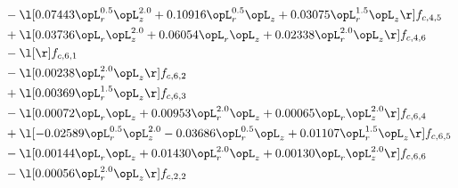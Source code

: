 \begin{alignat}{2}
& - \l[  0.07443 \opL_r^{0.5} \opL_z^{2.0} +  0.10916 \opL_r^{0.5} \opL_z +  0.03075 \opL_r^{1.5} \opL_z  \r] f_{c,4,5} \nonumber \\ 
& + \l[  0.03736 \opL_r \opL_z^{2.0} +  0.06054 \opL_r \opL_z +  0.02338 \opL_r^{2.0} \opL_z  \r] f_{c,4,6} \nonumber \\ 
& - \l[  \r] f_{c,6,1} \nonumber \\ 
& - \l[  0.00238 \opL_r^{2.0} \opL_z  \r] f_{c,6,2} \nonumber \\ 
& + \l[  0.00369 \opL_r^{1.5} \opL_z  \r] f_{c,6,3} \nonumber \\ 
& - \l[  0.00072 \opL_r \opL_z +  0.00953 \opL_r^{2.0} \opL_z +  0.00065 \opL_r \opL_z^{2.0}  \r] f_{c,6,4} \nonumber \\ 
& + \l[  -0.02589 \opL_r^{0.5} \opL_z^{2.0}   -0.03686 \opL_r^{0.5} \opL_z +  0.01107 \opL_r^{1.5} \opL_z  \r] f_{c,6,5} \nonumber \\ 
& - \l[  0.00144 \opL_r \opL_z +  0.01430 \opL_r^{2.0} \opL_z +  0.00130 \opL_r \opL_z^{2.0}  \r] f_{c,6,6} \nonumber \\ 
& - \l[  0.00056 \opL_r^{2.0} \opL_z  \r] f_{c,2,2} \nonumber \\ 
\end{alignat} 


